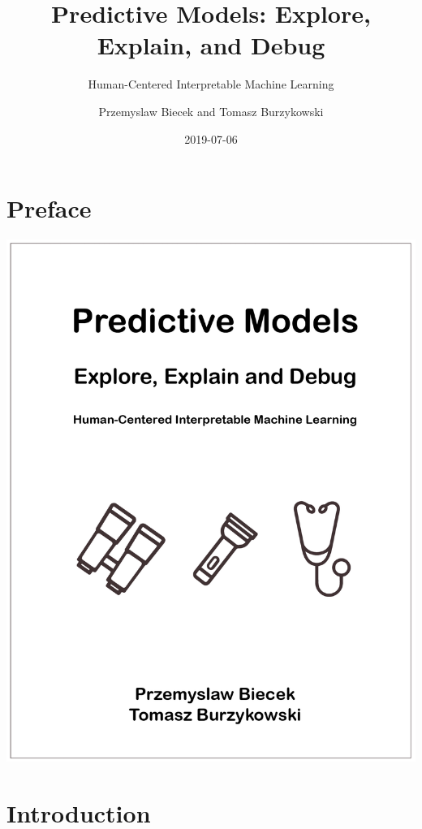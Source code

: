 \documentclass[12pt,]{krantz}
\title{Predictive Models: Explore, Explain, and Debug}
\subtitle{Human-Centered Interpretable Machine Learning}
\author{Przemyslaw Biecek and Tomasz Burzykowski}
\date{2019-07-06}
\theoremstyle{definition}
\theoremstyle{definition}
\theoremstyle{definition}
\theoremstyle{remark}
\begin{document}
\maketitle

{
\hypersetup{linkcolor=black}
\setcounter{tocdepth}{2}
\tableofcontents
}
\listoftables
\listoffigures
\hypertarget{preface}{%
\section*{Preface}\label{preface}}

\begin{center}\includegraphics[width=0.99\linewidth]{figure/front} \end{center}

\hypertarget{introduction}{%
\section{Introduction}\label{introduction}}
\end{document}
